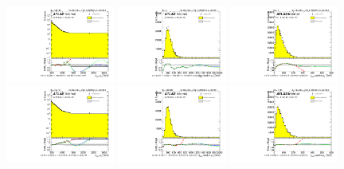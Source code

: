 \begin{figure}[htbp!]
\begin{center}
\includegraphics[angle=270, width=0.32\textwidth]{./figures/boosted/Reweight/Fits/Moriond_NoTag_2Trk_split_subl_Incl_leadHCand_Pt_m_1.pdf}
\includegraphics[angle=270, width=0.32\textwidth]{./figures/boosted/Reweight/Fits/Moriond_NoTag_2Trk_split_subl_Incl_leadHCand_trk0_Pt.pdf}
\includegraphics[angle=270, width=0.32\textwidth]{./figures/boosted/Reweight/Fits/Moriond_NoTag_2Trk_split_subl_Incl_leadHCand_trk1_Pt.pdf} \\
\includegraphics[angle=270, width=0.32\textwidth]{./figures/boosted/Reweight/Fits/Moriond_bkg_0_NoTag_2Trk_split_subl_Incl_leadHCand_Pt_m_1.pdf}
\includegraphics[angle=270, width=0.32\textwidth]{./figures/boosted/Reweight/Fits/Moriond_bkg_0_NoTag_2Trk_split_subl_Incl_leadHCand_trk0_Pt.pdf}
\includegraphics[angle=270, width=0.32\textwidth]{./figures/boosted/Reweight/Fits/Moriond_bkg_0_NoTag_2Trk_split_subl_Incl_leadHCand_trk1_Pt.pdf} \\

\end{center}
\end{figure}
